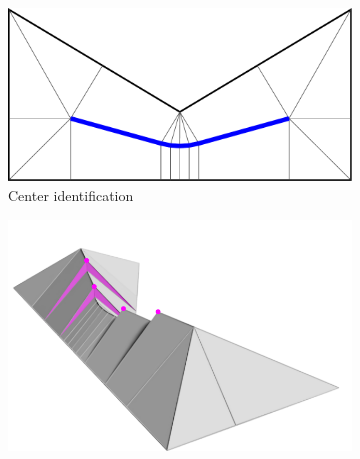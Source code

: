 \begin{figure}
\begin{subfigure}{\figwidth}
\includegraphics[width=\figheight]{sources-method-overview-2D-marked.pdf}
\caption{Center identification}\label{3d_surface_overview_center}
\end{subfigure}
\begin{subfigure}{\figwidth}\centering
\hspace*{\tempheightTwo}
\includegraphics[height=\figheight]{sources-method-overview-surface-quantized.png}

\vspace{\tempheight}


\end{subfigure}
\end{figure}
